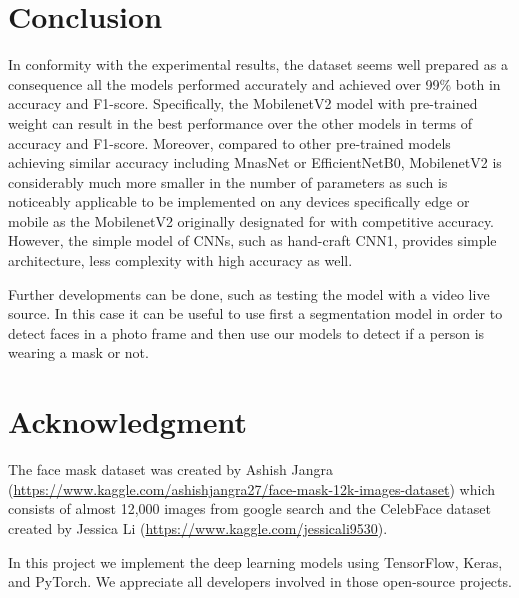 \documentclass[conference]{IEEEtran}
\begin{document}
\section{Conclusion}
In conformity with the experimental results, the dataset seems well prepared  as a consequence all the models performed accurately and achieved over 99\% both in accuracy and F1-score. Specifically, the MobilenetV2 model with pre-trained weight can result in the best performance over the other models in terms of accuracy and F1-score. Moreover, compared to other pre-trained models achieving similar accuracy including MnasNet or EfficientNetB0, MobilenetV2 is considerably much more smaller in the number of parameters as such is noticeably applicable to be implemented on any devices specifically edge or mobile as the MobilenetV2 originally designated for with competitive accuracy. However, the simple model of CNNs, such as hand-craft CNN1, provides simple architecture, less complexity with high accuracy as well.

Further developments can be done, such as testing the model with a video live source. In this case it can be useful to use first a segmentation model in order to detect faces in a photo frame and then use our models to detect if a person is wearing a mask or not. 

\section*{Acknowledgment}

The face mask dataset was created by Ashish Jangra (\url{https://www.kaggle.com/ashishjangra27/face-mask-12k-images-dataset}) which consists of almost 12,000 images from google search and the CelebFace dataset created by Jessica Li (\url{https://www.kaggle.com/jessicali9530}). 

In this project we implement the deep learning models using TensorFlow, Keras, and PyTorch. We appreciate all developers involved in those open-source projects. 



\printbibliography
\end{document}
